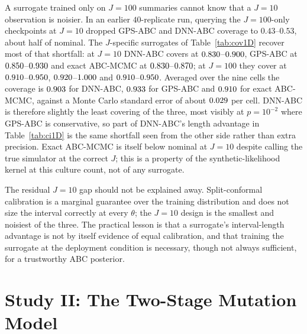 \documentclass[sn-basic,iicol,pdflatex]{sn-jnl}
\begin{document}
A surrogate trained only on $J=100$ summaries cannot know that a $J=10$
observation is noisier. In an earlier $40$-replicate run, querying the $J{=}100$-only checkpoints at $J=10$ dropped
GPS-ABC and DNN-ABC coverage to $0.43$--$0.53$, about half of nominal. The
$J$-specific surrogates of Table~\ref{tab:cov1D} recover most of that
shortfall: at $J=10$ DNN-ABC covers at $0.830$--$0.900$, GPS-ABC at $0.850$--$0.930$ and exact ABC-MCMC at
$0.830$--$0.870$; at $J=100$ they cover at $0.910$--$0.950$, $0.920$--$1.000$ and
$0.910$--$0.950$. Averaged over the nine cells the coverage is $0.903$ for DNN-ABC, $0.933$ for GPS-ABC and $0.910$ for exact
ABC-MCMC, against a Monte Carlo standard error of about $0.029$ per cell. DNN-ABC is therefore slightly the least covering of the three, most visibly at $p=10^{-2}$ where GPS-ABC is conservative,
so part of DNN-ABC's length advantage in Table~\ref{tab:ci1D} is the same shortfall seen from the other side rather than extra precision. Exact ABC-MCMC is itself below nominal at $J=10$
despite calling the true simulator at the correct $J$; this is a property of the synthetic-likelihood kernel at this culture count, not of any surrogate.

The residual $J=10$ gap should not be explained away. Split-conformal calibration
is a marginal guarantee over the training distribution and does not size the
interval correctly at every $\theta$; the $J=10$ design is the smallest and
noisiest of the three. The practical lesson is that a surrogate's interval-length
advantage is not by itself evidence of equal calibration, and that training the
surrogate at the deployment condition is necessary, though not always
sufficient, for a trustworthy ABC posterior.

\section{Study II: The Two-Stage Mutation Model}
\label{sec:sim3D}
\end{document}
